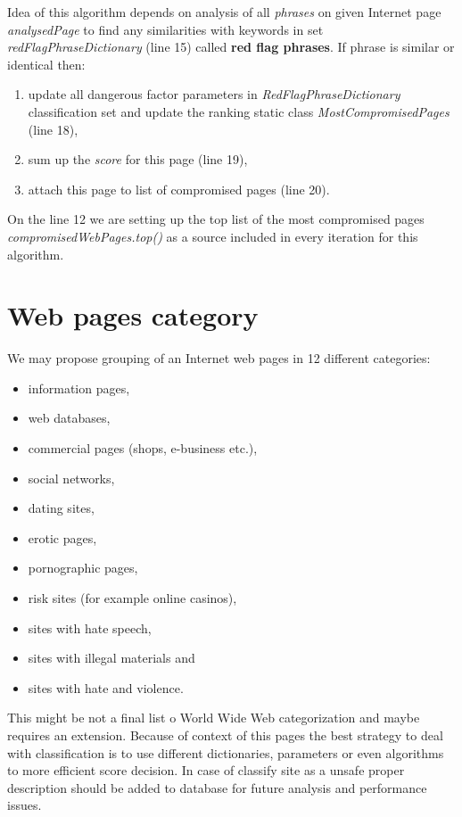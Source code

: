 \documentclass[9pt,a4paper]{extarticle}
\begin{document}
\begin{multicols}{2}
Idea of this algorithm depends on analysis of all \textit{phrases} on given Internet page \textit{analysedPage} to find any similarities 
with keywords in set \textit{redFlagPhraseDictionary} (line 15) called \textbf{red flag phrases}. If phrase is similar or identical then:
\begin{enumerate}
\item update all dangerous factor parameters in \textit{RedFlagPhraseDictionary} classification set and update the ranking static class \textit{MostCompromisedPages} (line 18),
\item sum up the \textit{score} for this page (line 19),
\item attach this page to list of compromised pages (line 20).
\end{enumerate}
On the line 12 we are setting up the top list of the most compromised pages \textit{compromisedWebPages.top()} as a source included in every iteration for this algorithm.

\section{Web pages category}
We may propose grouping of an Internet web pages in 12 different categories:
\begin{itemize}
\item information pages,
\item web databases,
\item commercial pages (shops, e-business etc.),
\item social networks,
\item dating sites,
\item erotic pages,
\item pornographic pages,
\item risk sites (for example online casinos),
\item sites with hate speech,
\item sites with illegal materials and
\item sites with hate and violence.
\end{itemize}
This might be not a final list o World Wide Web categorization and maybe requires an extension. Because of context of this pages the best strategy to deal with classification is to use different dictionaries, parameters or even algorithms to more efficient score decision. In case of classify site as a unsafe proper description should be added to database for future analysis and performance issues.


\end{multicols}
\end{document}
